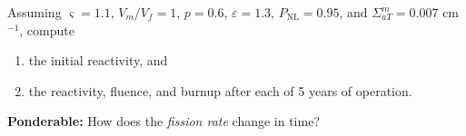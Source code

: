 \documentclass[compact]{ne630handout}
\begin{document}
\vspace{5pt}

Assuming $\varsigma=1.1$, $V_m/V_f=1$, $p=0.6$, $\varepsilon=1.3$,
$P_{\mathrm{NL}}=0.95$, and $\Sigma_{aT}^{m}=0.007$ cm$^{-1}$, compute
\begin{enumerate}\setlength{\itemsep}{2pt}\setlength{\parsep}{0pt}
 \item the initial reactivity, and
 \item the reactivity, fluence, and burnup after each of 5 years of operation.
\end{enumerate}

\vspace{5pt}

\textbf{Ponderable:} How does the \emph{fission rate} change in time?

\colend
\end{document}
